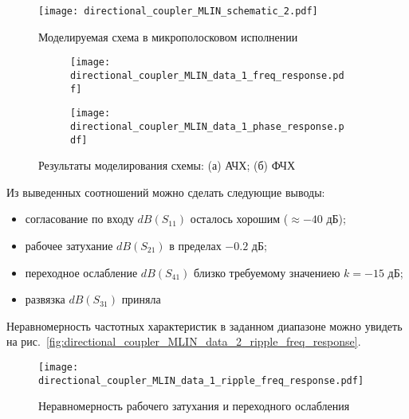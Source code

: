 \begin{figure}[!ht]
    \centering
    \texttt{[image: directional\_coupler\_MLIN\_schematic\_2.pdf]}
    \caption{Моделируемая схема в микрополосковом исполнении}%
    \label{fig:directional_coupler_MLIN_schematic_2}
\end{figure}

\begin{figure}[!ht]
    \begin{subfigure}[b]{0.45\textwidth}
        \centering
        \texttt{[image: directional\_coupler\_MLIN\_data\_1\_freq\_response.pdf]}
        \caption{}%
    \label{fig:directional_coupler_MLIN_data_1_freq_response}
    \end{subfigure}
    \hfill
    \begin{subfigure}[b]{0.45\textwidth}
        \centering
        \texttt{[image: directional\_coupler\_MLIN\_data\_1\_phase\_response.pdf]}
        \caption{}%
    \label{fig:directional_coupler_MLIN_data_1_phase_response}
    \end{subfigure}
    \caption{%
        Результаты моделирования схемы:
        (а) АЧХ;
        (б) ФЧХ
    }%
    \label{fig:directional_coupler_MLIN_data_1_responses}
\end{figure}

Из выведенных соотношений можно сделать следующие выводы:
\begin{itemize}
    \item согласование по входу $dB(S_{11})$ осталось хорошим ($\approx -40 \text{~дБ}$);
    \item рабочее затухание $dB(S_{21})$ в пределах $-0.2 \text{~дБ}$;
    \item переходное ослабление $dB(S_{41})$ близко требуемому значениею $k = -15 \text{~дБ}$;
    \item развязка $dB(S_{31})$ приняла
\end{itemize}

Неравномерность частотных характеристик в заданном диапазоне можно увидеть на рис.~\ref{fig:directional_coupler_MLIN_data_2_ripple_freq_response}.

\begin{figure}[!ht]
    \centering
    \texttt{[image: directional\_coupler\_MLIN\_data\_1\_ripple\_freq\_response.pdf]}
    \caption{Неравномерность рабочего затухания и переходного ослабления}%
    \label{fig:directional_coupler_MLIN_data_1_ripple_freq_response}
\end{figure}


